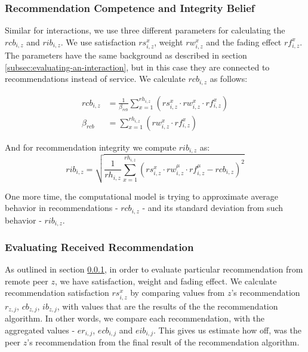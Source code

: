 \subsubsection{Recommendation Competence and Integrity Belief}
\label{subsubsec:recommendation-competence-integrity-belief}
Similar for interactions, we use three different parameters for calculating the $rcb_{i, z}$ and $rib_{i,z}$. 
We use satisfaction $rs^{x}_{i, z}$, weight $rw^{x}_{i, z}$ and the fading effect $rf^{x}_{i, z}$. 
The parameters have the same background as described in section \ref{subsec:evaluating-an-interaction}, but in this case they are connected to recommendations instead of service.
We calculate $rcb_{i, z}$ as follows:

\begin{equation}
\begin{split}
    rcb_{i, z} &= \frac{1}{\beta_{rcb}} \sum_{x = 1}^{rh_{i, z}}\left(rs_{i,z}^{x} \cdot rw_{i, z}^{x} \cdot rf_{i,z}^{x}\right) \\
    \beta_{rcb} &= \sum_{x = 1}^{rh_{i, z}}\left(rw_{i, z}^{x} \cdot rf_{i,z}^{x}\right)
\end{split}
\end{equation}

\noindent
And for recommendation integrity we compute $rib_{i, z}$ as:
\begin{equation}
    rib_{i, z} = \sqrt{\frac{1}{rh_{i, z}} \sum_{x=1}^{rh_{i,z}} \left(rs_{i,z}^{x} \cdot rw_{i, z}^{\mu} \cdot rf_{i,z}^{\mu} - rcb_{i,z}\right)^{2}}
\end{equation}

\noindent
One more time, the computational model is trying to approximate average behavior in recommendations - $rcb_{i,z}$ - and its standard deviation from such behavior - $rib_{i,z}$.

\subsubsection{Evaluating Received Recommendation}
As outlined in section \ref{subsubsec:recommendation-competence-integrity-belief}, in order to evaluate particular recommendation from remote peer $z$, we have satisfaction, weight and fading effect. 
We calculate recommendation satisfaction $rs^{x}_{i,z}$ by comparing values from $z$'s recommendation $r_{z,j}$, $cb_{z,j}$, $ib_{z,j}$, with values that are the results of the the recommendation algorithm.
In other words, we compare each recommendation, with the aggregated values - $er_{i,j}$, $ecb_{i,j}$ and $eib_{i,j}$. This gives us estimate how off, was the peer $z$'s recommendation from the final result of the recommendation algorithm.

